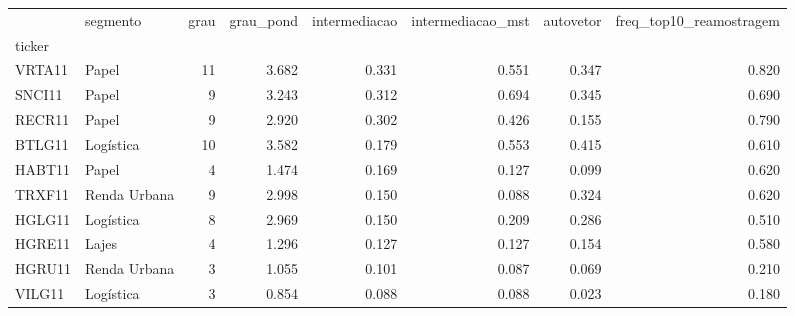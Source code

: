\begin{tabular}{llrrrrrr}
\toprule
 & segmento & grau & grau\_pond & intermediacao & intermediacao\_mst & autovetor & freq\_top10\_reamostragem \\
ticker &  &  &  &  &  &  &  \\
\midrule
VRTA11 & Papel & 11 & 3.682 & 0.331 & 0.551 & 0.347 & 0.820 \\
SNCI11 & Papel & 9 & 3.243 & 0.312 & 0.694 & 0.345 & 0.690 \\
RECR11 & Papel & 9 & 2.920 & 0.302 & 0.426 & 0.155 & 0.790 \\
BTLG11 & Logística & 10 & 3.582 & 0.179 & 0.553 & 0.415 & 0.610 \\
HABT11 & Papel & 4 & 1.474 & 0.169 & 0.127 & 0.099 & 0.620 \\
TRXF11 & Renda Urbana & 9 & 2.998 & 0.150 & 0.088 & 0.324 & 0.620 \\
HGLG11 & Logística & 8 & 2.969 & 0.150 & 0.209 & 0.286 & 0.510 \\
HGRE11 & Lajes & 4 & 1.296 & 0.127 & 0.127 & 0.154 & 0.580 \\
HGRU11 & Renda Urbana & 3 & 1.055 & 0.101 & 0.087 & 0.069 & 0.210 \\
VILG11 & Logística & 3 & 0.854 & 0.088 & 0.088 & 0.023 & 0.180 \\
\bottomrule
\end{tabular}
